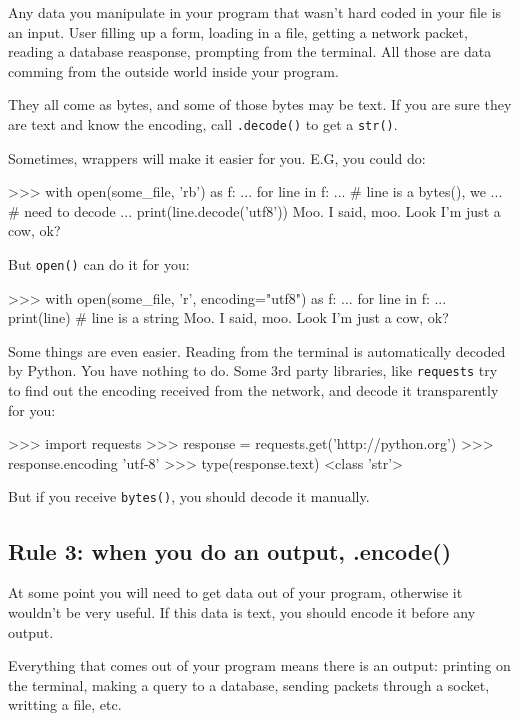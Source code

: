 Any data you manipulate in your program that wasn't hard coded in your file is an input. User filling up a form, loading in a file, getting a network packet, reading a database reasponse, prompting from the terminal. All those are data comming from the outside world inside your program.

They all come as bytes, and some of those bytes may be text. If you are sure they are text and know the encoding, call \lstinline{.decode()} to get a \lstinline{str()}.

Sometimes, wrappers will make it easier for you. E.G, you could do:

\begin{py3}
>>> with open(some_file, 'rb') as f:
...     for line in f:
...         # line is a bytes(), we
...         # need to decode
...         print(line.decode('utf8'))
Moo.
I said, moo.
Look I'm just a cow, ok?
\end{py3}

But \lstinline{open()} can do it for you:

\begin{py3}
>>> with open(some_file, 'r', encoding="utf8") as f:
...     for line in f:
...         print(line) # line is a string
Moo.
I said, moo.
Look I'm just a cow, ok?
\end{py3}

Some things are even easier. Reading from the terminal is automatically decoded by Python. You have nothing to do. Some 3rd party libraries, like \lstinline{requests} try to find out the encoding received from the network, and decode it transparently for you:

\begin{py3}
>>> import requests
>>> response = requests.get('http://python.org')
>>> response.encoding
'utf-8'
>>> type(response.text)
<class 'str'>
\end{py3}

But if you receive \lstinline{bytes()}, you should decode it manually.

\subsection{Rule 3: when you do an output, .encode()}

At some point you will need to get data out of your program, otherwise it wouldn't be very useful. If this data is text, you should encode it before any output.

Everything that comes out of your program means there is an output: printing on the terminal, making a query to a database, sending packets through a socket, writting a file, etc.

